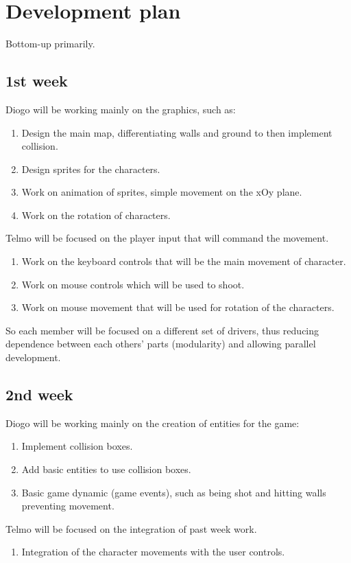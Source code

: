 \documentclass{article}
\theoremstyle{remark}
\begin{document}
\section{Development plan}
Bottom-up primarily.
\subsection{1st week}
Diogo will be working mainly on the graphics, such as:
\begin{enumerate}
	\item Design the main map, differentiating walls and ground to then implement collision.
	\item Design sprites for the characters.
	\item Work on animation of sprites, simple movement on the xOy plane.
	\item Work on the rotation of characters.
\end{enumerate}
Telmo will be focused on the player input that will command the movement.
\begin{enumerate}
	\item Work on the keyboard controls that will be the main movement of character.
	\item Work on mouse controls which will be used to shoot.
	\item Work on mouse movement that will be used for rotation of the characters.
\end{enumerate}
So each member will be focused on a different set of drivers, thus reducing dependence between each others' parts (modularity) and allowing parallel development.
\subsection{2nd week}
Diogo will be working mainly on the creation of entities for the game:
\begin{enumerate}
	\item Implement collision boxes.
	\item Add basic entities to use collision boxes.
	\item Basic game dynamic (game events), such as being shot and hitting walls preventing movement.
\end{enumerate}
Telmo will be focused on the integration of past week work.
\begin{enumerate}
	\item Integration of the character movements with the user controls.
\end{enumerate}
\end{document}
